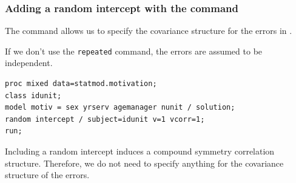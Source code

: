 \documentclass{beamer}
\begin{document}
\begin{frame}[fragile]
\frametitle{Adding a random intercept with the  command} 
\bi 
\item The command  allows us to specify the covariance structure for the errors in . 
\item If we don't use the \texttt{repeated} command, the errors are assumed to be independent.
\ei
\begin{tcolorbox}[colback=white, colframe=hecblue, title=\SASlang{} code for a random intercept model with independent errors]
\begin{small}
\begin{verbatim}
proc mixed data=statmod.motivation; 
class idunit; 
model motiv = sex yrserv agemanager nunit / solution; 
random intercept / subject=idunit v=1 vcorr=1; 
run;
\end{verbatim}
\end{small}
\end{tcolorbox}
{ \footnotesize   Including a random intercept \alert{induces} a compound symmetry correlation structure.
Therefore, we do not need to specify anything for the covariance structure of the errors.


}
\end{frame}
% 
% 
\end{document}
